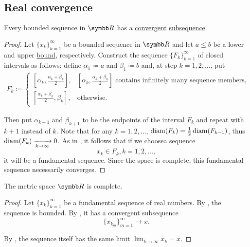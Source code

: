 \subsection{Real convergence}\label{subsec:real_vector_space_convergence}

\begin{theorem}\label{def:bolzano_weierstrass}
  Every bounded sequence in \( \BR \) has a \hyperref[def:net_convergence/limit]{convergent} \hyperref[def:sequence]{subsequence}.
\end{theorem}
\begin{proof}
  Let \( \{ x_k \}_{k=1}^\infty \) be a bounded sequence in \( \BR \) and let \( a \leq b \) be a lower and upper \hyperref[def:preordered_set/upper_lower_bound]{bound}, respectively. Construct the sequence \( \{ F_k \}_{k=1}^\infty \) of closed intervals as follows: define \( \alpha_1 \coloneqq a \) and \( \beta_1 \coloneqq b \) and, at step \( k = 1, 2, \ldots \), put
  \begin{align*}
    F_k \coloneqq \begin{cases}
      [\alpha_k, \tfrac{\alpha_k+\beta_k} 2], &[\alpha_k, \tfrac{\alpha_k+\beta_k} 2]\text{ contains infinitely many sequence members}, \\
      [\tfrac{\alpha_k+\beta_k} 2, \beta_k], &\text{otherwise}.
    \end{cases}
  \end{align*}

  Then put \( \alpha_{k+1} \) and \( \beta_{k+1} \) to be the endpoints of the interval \( F_k \) and repeat with \( k+1 \) instead of \( k \). Note that for any \( k = 1, 2, \ldots \), \( \operatorname{diam}(F_k) = \tfrac 1 2 \operatorname{diam}(F_{k-1}) \), thus \( \operatorname{diam}(F_k) \xrightarrow[k \to \infty]{} 0 \). As in , it follows that if we choose\AOC a sequence
  \begin{equation*}
    x_k \in F_k, k = 1, 2, \ldots,
  \end{equation*}
  it will be a fundamental sequence. Since the space is complete, this fundamental sequence necessarily converges.
\end{proof}

\begin{theorem}\label{def:real_numbers_complete_metric_space}
  The metric space \( \BR \) is complete.
\end{theorem}
\begin{proof}
  Let \( \{ x_k \}_{k=1}^\infty \) be a fundamental sequence of real numbers. By , the sequence is bounded. By , it has a convergent subsequence
  \begin{equation*}
    \{ x_{k_m} \}_{m=1}^\infty \to x.
  \end{equation*}

  By , the sequence itself has the same limit \( \lim_{k \to \infty} x_k = x \).
\end{proof}

